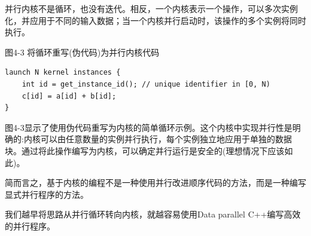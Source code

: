 并行内核不是循环，也没有迭代。相反，一个内核表示一个操作，可以多次实例化，并应用于不同的输入数据；当一个内核并行启动时，该操作的多个实例将同时执行。\par

\hspace*{\fill} \par %
图4-3 将循环重写(伪代码)为并行内核代码
\begin{lstlisting}[caption={}]
launch N kernel instances {
	int id = get_instance_id(); // unique identifier in [0, N)
	c[id] = a[id] + b[id];
}
\end{lstlisting}

图4-3显示了使用伪代码重写为内核的简单循环示例。这个内核中实现并行性是明确的:内核可以由任意数量的实例并行执行，每个实例独立地应用于单独的数据块。通过将此操作编写为内核，可以确定并行运行是安全的(理想情况下应该如此)。\par

简而言之，基于内核的编程不是一种使用并行改进顺序代码的方法，而是一种编写显式并行程序的方法。\par

\begin{tcolorbox}[colback=red!5!white,colframe=red!75!black]
我们越早将思路从并行循环转向内核，就越容易使用Data parallel C++编写高效的并行程序。
\end{tcolorbox}
























